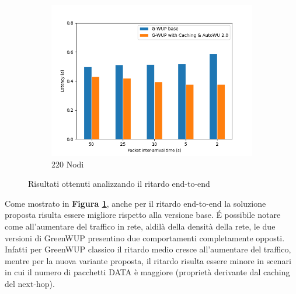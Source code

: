 \begin{figure}[h!]
\begin{subfigure}[t]{0.329\linewidth}
    \includegraphics[width=1.13\linewidth]{Contents/Images/graphs/analisi_final2.0/latency/latency_220.png}
    \caption{220 Nodi}
  \end{subfigure}
  \caption{Risultati ottenuti analizzando il ritardo end-to-end}
  \label{fig:analisi_Latency}
\end{figure}

Come mostrato in \textbf{Figura \ref{fig:analisi_Latency}}, anche per il ritardo end-to-end la soluzione proposta risulta essere migliore rispetto alla versione base. \'E possibile notare come all'aumentare del traffico in rete, aldilà della densità della rete, le due versioni di GreenWUP presentino due comportamenti completamente opposti. Infatti per GreenWUP classico il ritardo medio cresce all'aumentare del traffico, mentre per la nuova variante proposta, il ritardo risulta essere minore in scenari in cui il numero di pacchetti DATA è maggiore (proprietà derivante dal caching del next-hop).\\
\newpage

